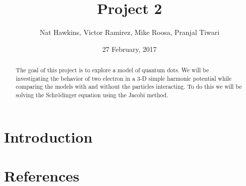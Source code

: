 \documentclass{article}
\title{Project 2}
\author{Nat Hawkins, Victor Ramirez, Mike Roosa, Pranjal Tiwari}
\date{27 February, 2017}
\begin{document}
\maketitle

\begin{abstract}
	The goal of this project is to explore a model of quantum dots. We will be investigating the behavior of two electron in a 3-D simple harmonic potential while comparing the models with and without the particles interacting. To do this we will be solving the Schrödinger equation using the Jacobi method. 
\end{abstract}
\section{Introduction}
\section{References}

\end{document}
